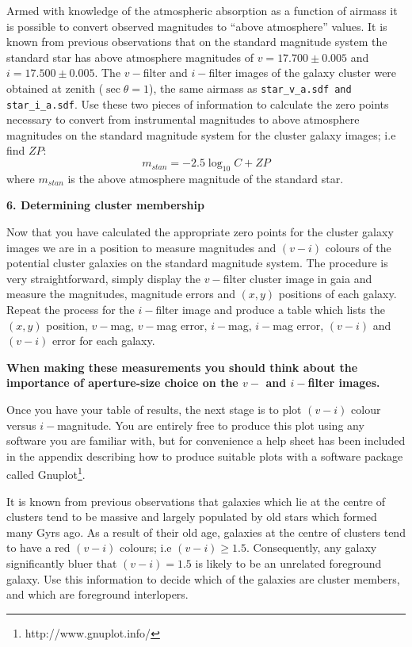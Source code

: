 Armed with knowledge of the atmospheric absorption as a function of
airmass it is possible to convert observed magnitudes to ``above
atmosphere'' values. It is known from previous observations that on the
standard magnitude system the standard star has above atmosphere
magnitudes of $v=17.700 \pm 0.005$ and $i=17.500\pm 0.005$. The $v-$filter
and $i-$filter images of the galaxy cluster were obtained at zenith 
($\sec \theta=1$), the same airmass as \verb,star_v_a.sdf and star_i_a.sdf,.
Use these two pieces of information to calculate the zero points
necessary to convert from instrumental magnitudes to above atmosphere
magnitudes on the standard magnitude system for the cluster galaxy
images; i.e find $ZP$:
\[
m_{stan} = -2.5\log_{10} C  + ZP 
\]
where $m_{stan}$ is the above atmosphere magnitude of the standard star.

{\large{\bf 6. Determining cluster membership}}

Now that you have calculated the appropriate zero points for the
cluster galaxy images we are in a position to measure magnitudes and
$(v-i)$ colours of the potential cluster galaxies on the standard
magnitude system. The procedure is very straightforward, simply
display the $v-$filter cluster image in {\sc gaia} and measure the
magnitudes, magnitude errors and $(x,y)$ positions of each
galaxy. Repeat the process for the $i-$filter image and produce a
table which lists the $(x,y)$ position, $v-$mag, $v-$mag error,
$i-$mag, $i-$mag error, $(v-i)$ and $(v-i)$ error for each
galaxy. 

{\bf When making these measurements you should think about the
importance of aperture-size choice on the $v-$ and $i-$filter images.}

Once you have your table of results, the next stage is to plot 
$(v-i)$ colour versus $i-$magnitude. You are entirely free to
produce this plot using any software you are familiar with, but 
for convenience a help sheet has been included in the appendix 
describing how to produce suitable plots with a software package
called Gnuplot\footnote{http://www.gnuplot.info/}.

It is known from previous observations that galaxies which lie at 
the centre of clusters tend to be massive and largely populated by old stars
which formed many Gyrs ago. As a result of their old age, galaxies at
the centre of clusters tend to have a red $(v-i)$ colours; i.e
$(v-i)\geq1.5$. Consequently, any galaxy significantly bluer that
$(v-i)=1.5$ is likely to be an unrelated foreground galaxy.
Use this information to decide which of the galaxies are cluster 
members, and which are foreground interlopers.

